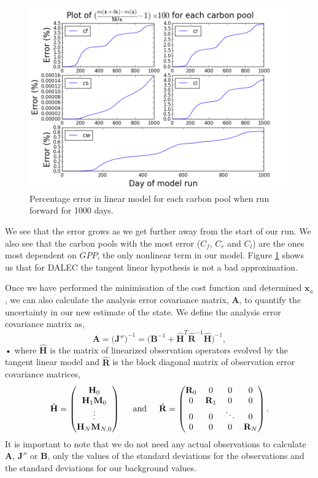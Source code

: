 \documentclass[11pt]{article}
\begin{document}
\begin{figure}[H]
\centering
\includegraphics[height=.4\textwidth]{Sub_linerr.png}
\caption{Percentage error in linear model for each carbon pool when run forward for 1000 days.}
\label{linerr}
\end{figure}
We see that the error grows as we get further away from the start of our run. We also see that the carbon pools with the most error ($C_f$, $C_r$ and $C_l$) are the ones most dependent on $GPP$, the only nonlinear term in our model. Figure \ref{linerr} shows us that for DALEC the tangent linear hypothesis is not a bad approximation.

Once we have performed the minimisation of the cost function and determined $\textbf{x}_a$, we can also calculate the analysis error covariance matrix, $\textbf{A}$, to quantify the uncertainty in our new estimate of the state. We define the analysis error covariance matrix as,
\begin{equation}
\textbf{A} = \big(\mathbf{J}''\big)^{-1} = \big(\mathbf{B}^{-1}+\hat{\mathbf{H}}^{T}\hat{\mathbf{R}}^{-1}\hat{\textbf{H}}\big)^{-1}, \label{Amat}
\end{equation}• 
where $\hat{\mathbf{H}}$ is the matrix of linearized observation operators evolved by the tangent linear model and $\hat{\mathbf{R}}$ is the block diagonal matrix of observation error covariance matrices,
\begin{equation}
\hat{\mathbf{H}}=
\begin{pmatrix}
\mathbf{H}_0 \\
\mathbf{H}_1\mathbf{M}_0\\
\vdots \\
\mathbf{H}_N\mathbf{M}_{N,0}
\end{pmatrix}
\hspace{5mm} \text{and} \hspace{5mm}
\hat{\mathbf{R}}=
\begin{pmatrix}
\mathbf{R}_0 & 0 & 0 & 0 \\
0 & \mathbf{R}_1 & 0 & 0 \\
0 & 0 & \ddots & 0 \\
0 & 0 & 0 & \mathbf{R}_N
\end{pmatrix}.
\end{equation}
It is important to note that we do not need any actual observations to calculate $\textbf{A}$, $\textbf{J}''$ or $\textbf{B}$, only the values of the standard deviations for the observations and the standard deviations for our background values.  
\end{document}
